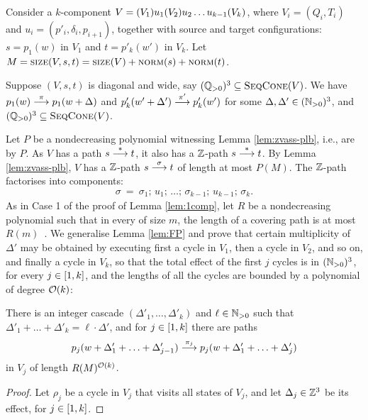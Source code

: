 \begin{appendixproof}
%
Consider a $k$-component \tvass  $V = (V_1) u_1 (V_2) u_2 \ldots u_{k-1} (V_k)$,
where $V_i = (Q_i, T_i)$ and $u_i = (p'_i, \delta_i, p_{i+1})$,
together with source and target configurations: 
$s=p_1(w)$ in $V_1$ and $t=p'_k(w')$ in $V_k$.
Let $M = \textsc{size}(V, s, t) = \textsc{size}(V) + \textsc{norm}(s) + \textsc{norm}(t)$.

Suppose $(V, s, t)$ is diagonal and wide, say $(\mathbb{Q}_{>0})^3 \subseteq \textsc{SeqCone}(V)$.
%
We have
$p_1(w) \stackrel{\pi}{\longrightarrow} p_1(w+\Delta)$ and
$p'_k(w'+\Delta')\stackrel{\pi'}{\longrightarrow} p'_k(w')$  for some $\Delta,\Delta'\in(\mathbb{N}_{>0})^3$, and 
$(\mathbb{Q}_{>0})^3 \subseteq \textsc{SeqCone}(V)$.
%

Let $P$ be a nondecreasing polynomial witnessing Lemma \ref{lem:zvass-plb}, i.e.,
\tzvass are \lb by $P$.
As $V$ has a path $s \stackrel{*}{\longrightarrow} t$, it also has a $\mathbb{Z}$-path $s\stackrel{*}{\longrightarrow} t$.
By Lemma \ref{lem:zvass-plb}, $V$ has a $\mathbb{Z}$-path $s \stackrel{\sigma}{\longrightarrow} t$ of length at most $P(M)$.
The $\mathbb{Z}$-path factorises into components:
%
\begin{align} \label{eq:Zpath}
\sigma \ = \ 
\sigma_1;\, u_1; \, \ldots; \, \sigma_{k-1}; \, u_{k-1}; \, \sigma_k.
\end{align}
%
As in Case 1 of the proof of Lemma \ref{lem:1comp},
let $R$ be a nondecreasing polynomial  such that in every \tvass of size $m$, the length of a covering
path is at most $R(m)$~\cite[Lemma~3.4]{DBLP:journals/tcs/Rackoff78}.
%
We generalise Lemma \ref{lem:FP} and prove that certain multiplicity of $\Delta'$
may be obtained by executing first a cycle in $V_1$, then a cycle in $V_2$, and so on,
and finally a cycle in $V_k$, so that the total effect of the first $j$ cycles is in $(\mathbb{N}_{>0})^3$,
for every $j\in[1, k]$,
and the lengths of all the cycles are bounded by a polynomial of degree ${\cal O}(k)$:
%
\begin{lemma} \label{lem:FPgen}
There is an integer cascade $(\Delta'_1, \ldots, \Delta'_k)$ and $\ell\in\mathbb{N}_{>0}$ such that
$\Delta'_1 + \ldots + \Delta'_k = \ell\cdot\Delta'$, 
and for $j\in[1, k]$ there are paths
\[
p_j(w+\Delta'_1 + \ldots + \Delta'_{j-1}) \stackrel{\pi_j}{\longrightarrow}  p_j(w+ \Delta'_1 + \ldots + \Delta'_{j})
\]
in $V_j$
of length $R(M)^{{\cal O}(k)}$.
\end{lemma}
%
\begin{proof} %
Let $\rho_j$ be a cycle in $V_j$ that visits all states of $V_j$, and
let $\Delta_j\in\mathbb{Z}^3$ be its effect, for $j\in[1, k]$.

\end{proof}
\end{appendixproof}
